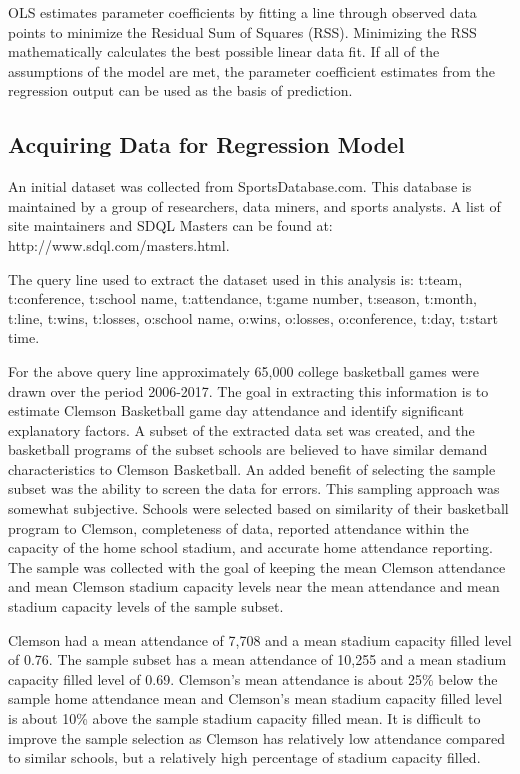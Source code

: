 \documentclass[preprint,12pt,times]{elsarticle}
\begin{document}
OLS estimates parameter coefficients by fitting a line through observed data points to minimize the Residual Sum of Squares (RSS).  Minimizing the RSS mathematically calculates the best possible linear data fit.  If all of the assumptions of the model are met, the parameter coefficient estimates from the regression output can be used as the basis of prediction.

\begin{large}
\section{\textbf{Acquiring Data for Regression Model}}
\end{large}

An initial dataset was collected from SportsDatabase.com.  This database is maintained by a group of researchers, data miners, and sports analysts.  A list of site maintainers and SDQL Masters can be found at: http://www.sdql.com/masters.html.

The query line used to extract the dataset used in this analysis is:
t:team, t:conference, t:school name, t:attendance, t:game number, t:season, t:month, t:line, t:wins, t:losses, o:school name,  o:wins, o:losses, o:conference, t:day, t:start time.

For the above query line approximately 65,000 college basketball games were drawn over the period 2006-2017.  The goal in extracting this information is to estimate Clemson Basketball game day attendance and identify significant explanatory factors.  A subset of the extracted data set was created, and the basketball programs of the subset schools are believed to have similar demand characteristics to Clemson Basketball.  An added benefit of selecting the sample subset was the ability to screen the data for errors.  This sampling approach was somewhat subjective.  Schools were selected based on similarity of their basketball program to Clemson, completeness of data, reported attendance within the capacity of the home school stadium, and accurate home attendance reporting.  The sample was collected with the goal of keeping the mean Clemson attendance and mean Clemson stadium capacity levels near the mean attendance and mean stadium capacity levels of the sample subset.

Clemson had a mean attendance of 7,708 and a mean stadium capacity filled level of 0.76.  The sample subset has a mean attendance of 10,255 and a mean stadium capacity filled level of 0.69.  Clemson’s mean attendance is about 25\% below the sample home attendance mean and Clemson's mean stadium capacity filled level is about 10\% above the sample stadium capacity filled mean.  It is difficult to improve the sample selection as Clemson has relatively low attendance compared to similar schools, but a relatively high percentage of stadium capacity filled.\\
\end{document}
